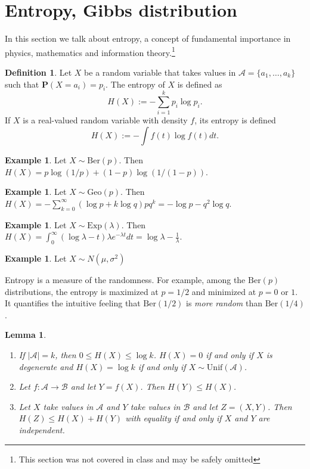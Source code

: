 \documentclass[preprint,  11pt]{amsart}
\theoremstyle{plain} %
\newtheorem{lemma}[theorem]{Lemma}
\theoremstyle{definition} %
\newtheorem{definition}[theorem]{Definition}
\newtheorem{example}[theorem]{Example}
\begin{document}
{\color{magenta}
\section{Entropy, Gibbs distribution}
In this section we talk about entropy, a concept of fundamental importance in physics, mathematics and information theory.\footnote{This section was not covered in class and may be safely omitted}
\begin{definition} Let $X$ be a random variable that takes values in ${\mathcal A}=\{a_{1},\ldots ,a_{k}\}$ such that $\mathbf{P}(X=a_{i})=p_{i}$. The entropy of $X$ is defined as 
$$
H(X) := -\sum\limits_{i=1}^{k} p_{i}\log p_{i}.
$$ 
If $X$ is a real-valued random variable with density $f$, its entropy is defined
$$
H(X):= -\int f(t)\log f(t) dt.
$$ 
\end{definition}
\begin{example} Let $X\sim\mbox{Ber}(p)$. Then $H(X)=p\log(1/p) +(1-p)\log(1/(1-p))$.
\end{example}

\begin{example} Let $X\sim \mbox{Geo}(p)$. Then $H(X)=-\sum\limits_{k=0}^{\infty}(\log p+k\log q) pq^{k} = -\log p -q^{2}\log q$. 
\end{example}

\begin{example} Let $X\sim \mbox{Exp}(\lambda)$. Then $H(X)=\int_{0}^{\infty} (\log \lambda -t)\lambda e^{-\lambda t}dt=\log \lambda -\frac{1}{\lambda}$.
\end{example}

\begin{example} Let $X\sim N(\mu,{\sigma}^{2})$
\end{example}

Entropy is a measure of the randomness. For example, among the $\mbox{Ber}(p)$ distributions, the entropy is maximized at $p=1/2$ and minimized at $p=0\mbox{ or }1$. It quantifies the intuitive feeling that $\mbox{Ber}(1/2)$ is {\em more random} than $\mbox{Ber}(1/4)$. 

\begin{lemma}
\begin{enumerate}\setlength\itemsep{6pt}
\item If $|{\mathcal A}|=k$, then $0\le H(X)\le \log k$. $H(X)=0$ if and only if $X$ is degenerate and $H(X)=\log k$ if and only if $X\sim \mbox{Unif}({\mathcal A})$.
\item Let $f:{\mathcal A}\rightarrow {\mathcal B}$ and let $Y=f(X)$. Then $H(Y)\le H(X)$.
\item Let $X$ take values in ${\mathcal A}$ and $Y$ take values in ${\mathcal B}$ and let $Z=(X,Y)$. Then $H(Z)\le H(X)+H(Y)$ with equality if and only if $X$ and $Y$ are independent.
\end{enumerate}
\end{lemma}

}
\end{document}
